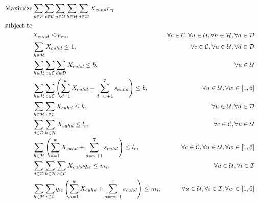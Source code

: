 \documentclass[11pt]{article}
\begin{document}
\begin{align}
\text{Maximize} & \displaystyle
\sum\limits_{p\in \mathcal{P}}
\sum\limits_{c\in \mathcal{C}}
\sum\limits_{u\in \mathcal{U}}
\sum\limits_{h\in \mathcal{H}}
\sum\limits_{d\in \mathcal{D}}
X_{{c}{u}{h}{d}}  r_{{c}{p}} \label{mathmodel_obj}&
\\
\text{subject to} \notag\\
&X_{{c}{u}{h}{d}} \leq e_{{c}{u}},&\forall c \in \mathcal{C}, \forall u \in \mathcal{U}, \forall h \in \mathcal{H}, \forall d \in \mathcal{D} \label{mathmodel_eligibility}&\\
&\sum\limits_{h\in\mathcal{H}}X_{{c}{u}{h}{d}} \leq 1, &\forall c \in \mathcal{C}, \forall u \in \mathcal{U}, \forall d \in \mathcal{D} \label{mathmodel_singlechannel}&\\
&\sum\limits_{h\in\mathcal{H}}\sum\limits_{c\in\mathcal{C}}\sum\limits_{d\in\mathcal{D}}X_{{c}{u}{h}{d}} \leq b, &\forall u \in \mathcal{U} \label{mathmodel_percustomercommlimit}&\\
&\sum\limits_{h\in\mathcal{H}}\sum\limits_{c\in\mathcal{C}}\left(\sum_{d=1}^{w}X_{{c}{u}{h}{d}} + \sum_{d=w+1}^{7}s_{{c}{u}{h}{d}}\right) \leq b, &\forall u \in \mathcal{U}, \forall w \in [1,6] \label{mathmodel_percustomercommlimit_rh}&\\
&\sum\limits_{h\in\mathcal{H}}\sum\limits_{c\in\mathcal{C}}X_{{c}{u}{h}{d}} \leq k, &\forall u \in \mathcal{U}, \forall d \in \mathcal{D} \label{mathmodel_percustomercommlimit_day}&\\
&\sum\limits_{d\in\mathcal{D}}\sum\limits_{h\in\mathcal{H}}X_{{c}{u}{h}{d}} \leq l_{c}, &\forall c \in \mathcal{C}, \forall u \in \mathcal{U} \label{mathmodel_percustomercamplimit}&\\
&\sum\limits_{h\in\mathcal{H}}\left( \sum_{d=1}^{w}X_{{c}{u}{h}{d}} + \sum_{d=w+1}^{7}s_{{c}{u}{h}{d}}\right) \leq l_{c}, &\forall c \in \mathcal{C}, \forall u \in \mathcal{U}, \forall w \in [1,6] \label{mathmodel_percustomercamplimit_rh}&\\
&\sum\limits_{d\in\mathcal{D}}\sum\limits_{h\in\mathcal{H}}\sum\limits_{c\in\mathcal{C}}X_{{c}{u}{h}{d}}  q_{{i}{c}} \leq m_{i}, &\forall u \in \mathcal{U}, \forall i \in \mathcal{I} \label{mathmodel_weeklyquotalimit}&\\
&\sum\limits_{h\in\mathcal{H}}\sum\limits_{c\in\mathcal{C}}q_{{i}{c}}\left(\sum_{d=1}^{w}X_{{c}{u}{h}{d}} + \sum_{d=w+1}^{7}s_{{c}{u}{h}{d}}\right) \leq m_{i}, &\forall u \in \mathcal{U}, \forall i \in \mathcal{I}, \forall w \in [1,6] \label{mathmodel_weeklyquotalimit_rh}&\\

\end{align}
\end{document}
